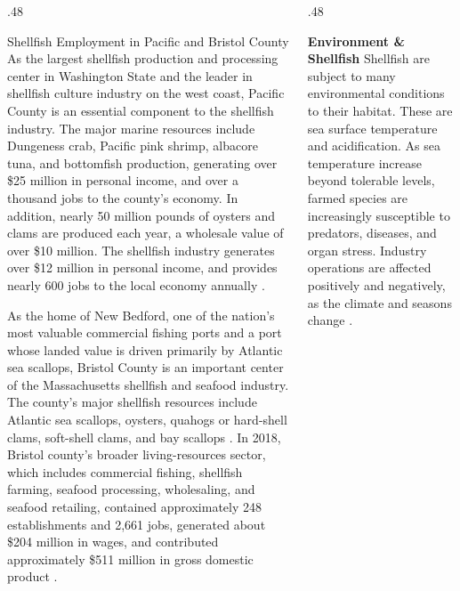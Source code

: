 \documentclass[final]{beamer}
\begin{document}
\begin{frame}[fragile]{}
\begin{columns}
\begin{column}{.48\textwidth}
\begin{exampleblock}{Shellfish Employment in Pacific and Bristol County}
    As the largest shellfish production and processing center in Washington State and the leader in shellfish culture industry on the west coast, Pacific County is an essential component to the shellfish industry. The major marine resources include Dungeness crab, Pacific pink shrimp, albacore tuna, and bottomfish production, generating over \$25 million in personal income, and over a thousand jobs to the county's economy. In addition, nearly 50 million pounds of oysters and clams are produced each year, a wholesale value of over \$10 million. The shellfish industry generates over \$12 million in personal income, and provides nearly 600 jobs to the local economy annually \cite{shellfish_pacific_county}.

    As the home of New Bedford, one of the nation's most valuable commercial fishing ports and a port whose landed value is driven primarily by Atlantic sea scallops, Bristol County is an important center of the Massachusetts shellfish and seafood industry. The county’s major shellfish resources include Atlantic sea scallops, oysters, quahogs or hard-shell clams, soft-shell clams, and bay scallops%
    \cite{fisheries_us_noaa}. In 2018, Bristol county's broader living-resources sector, which includes commercial fishing, shellfish farming, seafood processing, wholesaling, and seafood retailing, contained approximately 248 establishments and 2,661 jobs, generated about \$204 million in wages, and contributed approximately \$511 million in gross domestic product \cite{padanaram_harbor}.
	\end{exampleblock}
	\end{column}


    \begin{column}{.48\textwidth}

		
	\begin{block}{\textbf{Environment \& Shellfish}}
    Shellfish are subject to many environmental conditions to their habitat. These are sea surface temperature and acidification. As sea temperature increase beyond tolerable levels, farmed species are increasingly susceptible to  predators, diseases, and organ stress. Industry operations are affected positively and negatively, as the climate and seasons change \cite{climate_shellfish}.


\end{block}
\end{column}
\end{columns}
\end{frame}
\end{document}
